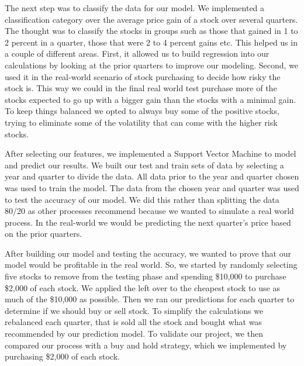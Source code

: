 \documentclass[conference]{IEEEtran}
\begin{document}
The next step was to classify the data for our model. We implemented a classification category over the average price gain of a stock over several quarters.  The thought was to classify the stocks in groups such as those that gained in 1 to 2 percent in a quarter, those that were 2 to 4 percent gains etc. This helped us in a couple of different areas.  First, it allowed us to build regression into our calculations by looking at the prior quarters to improve our modeling.  Second, we used it in the real-world scenario of stock purchasing to decide how risky the stock is. This way we could in the final real world test purchase more of the stocks expected to go up with a bigger gain than the stocks with a minimal gain.  To keep things balanced we opted to always buy some of the positive stocks, trying to eliminate some of the volatility that can come with the higher risk stocks.

After selecting our features, we implemented a Support Vector Machine to model and predict our results.  We built our test and train sets of data by selecting a year and quarter to divide the data.  All data prior to the year and quarter chosen was used to train the model. The data from the chosen year and quarter was used to test the accuracy of our model.  We did this rather than splitting the data 80/20 as other processes recommend because we wanted to simulate a real world process.  In the real-world we would be predicting the next quarter's price based on the prior quarters.  

After building our model and testing the accuracy, we wanted to prove that our model would be profitable in the real world.  So, we started by randomly selecting five stocks to remove from the testing phase and spending \$10,000 to purchase \$2,000 of each stock.  We applied the left over to the cheapest stock to use as much of the \$10,000 as possible. Then we ran our predictions for each quarter to determine if we should buy or sell stock.  To simplify the calculations we rebalanced each quarter, that is sold all the stock and bought what was recommended by our prediction model.  To validate our project, we then compared our process with a buy and hold strategy, which we implemented by purchasing \$2,000 of each stock.
\end{document}
